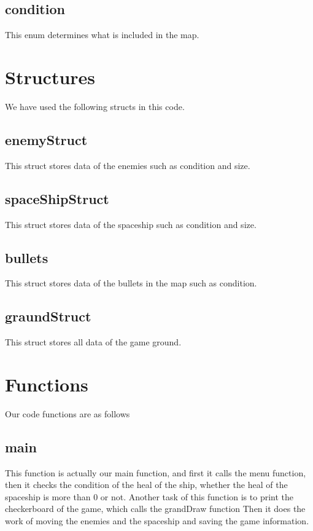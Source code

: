 \documentclass[12pt,a4paper]{article}
\begin{document}
	\subsection{condition}
	This enum determines what is included in the map.
	\section{Structures}\label{description.structs}
	We have used the following structs in this code.
	\subsection{enemyStruct}
	This struct stores data of the enemies such as condition and size.
	\subsection{spaceShipStruct}
	This struct stores data of the spaceship such as condition and size.
	\subsection{bullets}
	This struct stores data of the bullets in the map such as condition.
	\subsection{graundStruct}
	This struct stores all data of the game ground.
	\section{Functions}\label{description.func}
	Our code functions are as follows
	\subsection{main}
	This function is actually our main function, and first it calls the menu function, then it checks the condition of the heal of the ship, whether the heal of the spaceship is more than 0 or not.
    Another task of this function is to print the checkerboard of the game, which calls the grandDraw function
    Then it does the work of moving the enemies and the spaceship and saving the game information.
	
\end{document}
